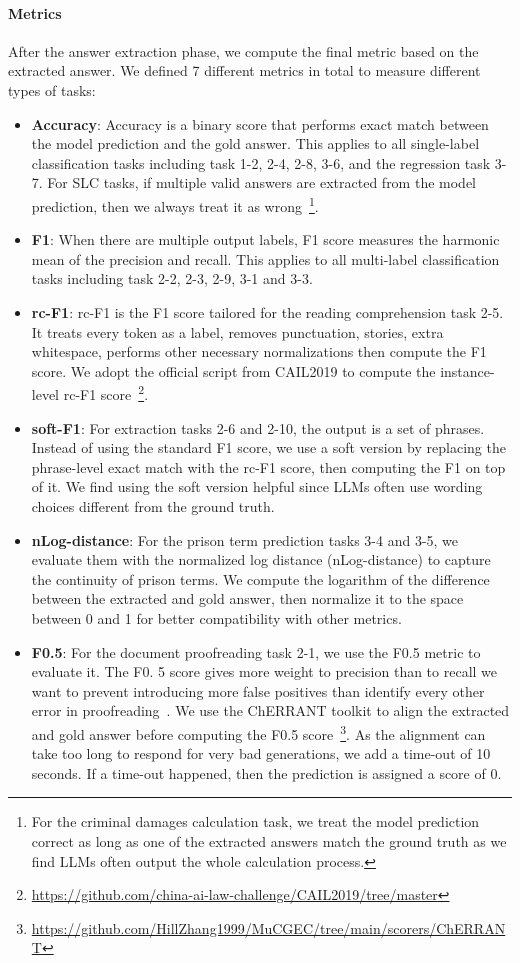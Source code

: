 \paragraph{Metrics}
After the answer extraction phase, we compute the final metric based on the extracted answer. We defined 7 different metrics in total to measure different types of tasks:
\begin{itemize}
    \item \textbf{Accuracy}: Accuracy is a binary score that performs exact match between the model prediction and the gold answer. This applies to all single-label classification tasks including task 1-2, 2-4, 2-8, 3-6, and the regression task 3-7. For SLC tasks, if multiple valid answers are extracted from the model prediction, then we always treat it as wrong~\footnote{For the criminal damages calculation task, we treat the model prediction correct as long as one of the extracted answers match the ground truth as we find LLMs often output the whole calculation process.}.
    \item \textbf{F1}: When there are multiple output labels, F1 score measures the harmonic mean of the precision and recall. This applies to all multi-label classification tasks including task 2-2, 2-3, 2-9, 3-1 and 3-3.
    \item \textbf{rc-F1}: rc-F1 is the F1 score tailored for the reading comprehension task 2-5. It treats every token as a label, removes punctuation, stories, extra whitespace, performs other necessary normalizations then compute the F1 score. We adopt the official script from CAIL2019 to compute the instance-level rc-F1 score~\footnote{\url{https://github.com/china-ai-law-challenge/CAIL2019/tree/master}}.
    \item \textbf{soft-F1}: For extraction tasks 2-6 and 2-10, the output is a set of phrases. Instead of using the standard F1 score, we use a soft version by replacing the phrase-level exact match with the rc-F1 score, then computing the F1 on top of it. We find using the soft version helpful since LLMs often use wording choices different from the ground truth.
    \item \textbf{nLog-distance}: For the prison term prediction tasks 3-4 and 3-5, we evaluate them with the normalized log distance (nLog-distance) to capture the continuity of prison terms. We compute the logarithm of the difference between the extracted and gold answer, then normalize it to the space between 0 and 1 for better compatibility with other metrics.
    \item \textbf{F0.5}: For the document proofreading task 2-1, we use the F0.5 metric to evaluate it. The F0. 5 score gives more weight to precision than to recall we want to prevent introducing more false positives than identify every other error in proofreading~\cite{zhang2022mucgec}. We use the ChERRANT toolkit to align the extracted and gold answer before computing the F0.5 score~\footnote{\url{https://github.com/HillZhang1999/MuCGEC/tree/main/scorers/ChERRANT}}. As the alignment can take too long to respond for very bad generations, we add a time-out of 10 seconds. If a time-out happened, then the prediction is assigned a score of 0.

\end{itemize}
